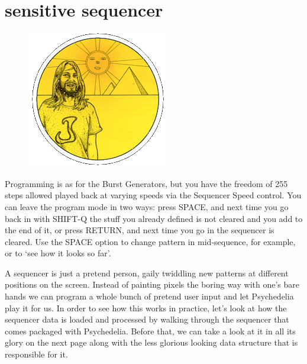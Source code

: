 \chapter{sensitive sequencer} 
\label{sec:sequencer}
\lstset{style=6502Style}
\lstset{ 
   aboveskip=5pt,
   belowskip=0pt,
}

\begin{definition}
\setlength{\intextsep}{0pt}%
\setlength{\columnsep}{3pt}%
\begin{figure}
\includegraphics[width=\linewidth]{src/callout/psych.png} 
\end{figure}
\small
Programming is as for the Burst Generators, but you have the
freedom of 255 steps allowed played back at varying speeds via the
Sequencer Speed control. You can leave the program mode in two
ways: press SPACE, and next time you go back in with SHIFT-Q the
stuff you already defined is not cleared and you add to the end of it,
or press RETURN, and next time you go in the sequencer is cleared.
Use the SPACE option to change pattern in mid-sequence, for
example, or to ‘see how it looks so far’.
\end{definition}

A sequencer is just a pretend person, gaily twiddling new patterns at different positions on the screen. Instead of painting pixels
the boring way with one's bare hands we can program a whole bunch of pretend user input and let Psychedelia play it for us. In order
to see how this works in practice, let's look at how the sequencer data is loaded and processed by walking through the sequencer
that comes packaged with Psychedelia. Before that, we can take a look at it in all its glory on the next page along with the less
glorious looking data structure that is responsible for it.

